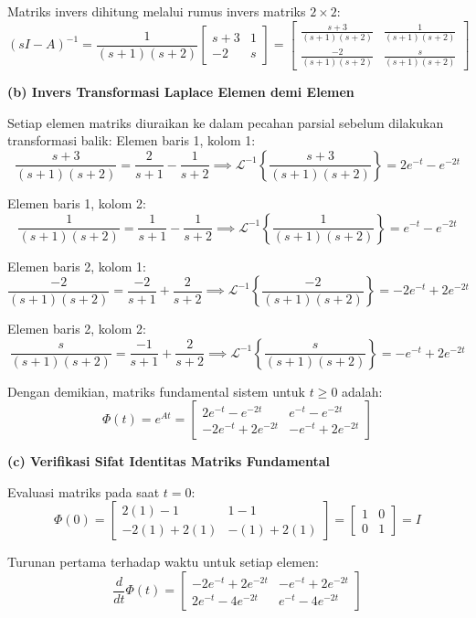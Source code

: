 \documentclass[11pt,a4paper]{article}
\begin{document}
Matriks invers dihitung melalui rumus invers matriks $2 \times 2$:
$$(sI - A)^{-1} = \frac{1}{(s+1)(s+2)} \begin{bmatrix} s+3 & 1 \\ -2 & s \end{bmatrix} = \begin{bmatrix} \frac{s+3}{(s+1)(s+2)} & \frac{1}{(s+1)(s+2)} \\ \frac{-2}{(s+1)(s+2)} & \frac{s}{(s+1)(s+2)} \end{bmatrix}$$

\textbf{(b) Invers Transformasi Laplace Elemen demi Elemen}

Setiap elemen matriks diuraikan ke dalam pecahan parsial sebelum dilakukan transformasi balik:
Elemen baris 1, kolom 1:
$$\frac{s+3}{(s+1)(s+2)} = \frac{2}{s+1} - \frac{1}{s+2} \implies \mathcal{L}^{-1} \left\{ \frac{s+3}{(s+1)(s+2)} \right\} = 2e^{-t} - e^{-2t}$$

Elemen baris 1, kolom 2:
$$\frac{1}{(s+1)(s+2)} = \frac{1}{s+1} - \frac{1}{s+2} \implies \mathcal{L}^{-1} \left\{ \frac{1}{(s+1)(s+2)} \right\} = e^{-t} - e^{-2t}$$

Elemen baris 2, kolom 1:
$$\frac{-2}{(s+1)(s+2)} = \frac{-2}{s+1} + \frac{2}{s+2} \implies \mathcal{L}^{-1} \left\{ \frac{-2}{(s+1)(s+2)} \right\} = -2e^{-t} + 2e^{-2t}$$

Elemen baris 2, kolom 2:
$$\frac{s}{(s+1)(s+2)} = \frac{-1}{s+1} + \frac{2}{s+2} \implies \mathcal{L}^{-1} \left\{ \frac{s}{(s+1)(s+2)} \right\} = -e^{-t} + 2e^{-2t}$$

Dengan demikian, matriks fundamental sistem untuk $t \ge 0$ adalah:
$$\Phi(t) = e^{At} = \begin{bmatrix} 2e^{-t} - e^{-2t} & e^{-t} - e^{-2t} \\ -2e^{-t} + 2e^{-2t} & -e^{-t} + 2e^{-2t} \end{bmatrix}$$

\textbf{(c) Verifikasi Sifat Identitas Matriks Fundamental}

Evaluasi matriks pada saat $t = 0$:
$$\Phi(0) = \begin{bmatrix} 2(1) - 1 & 1 - 1 \\ -2(1) + 2(1) & -(1) + 2(1) \end{bmatrix} = \begin{bmatrix} 1 & 0 \\ 0 & 1 \end{bmatrix} = I$$

Turunan pertama terhadap waktu untuk setiap elemen:
$$\frac{d}{dt}\Phi(t) = \begin{bmatrix} -2e^{-t} + 2e^{-2t} & -e^{-t} + 2e^{-2t} \\ 2e^{-t} - 4e^{-2t} & e^{-t} - 4e^{-2t} \end{bmatrix}$$
\end{document}
